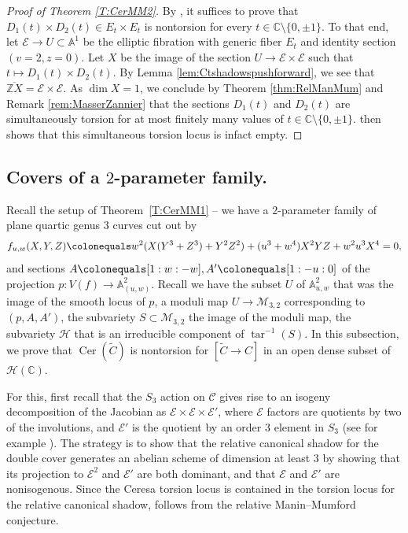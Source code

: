\documentclass[reqno,10pt]{amsart}
\theoremstyle{definition}
\theoremstyle{definition}
\def\C{{\mathbb C}}
\def\Z{{\mathbb Z}}
\def\C{{\mathbb C}}
\DeclareMathOperator{\tar}{tar}
\newcommand{\Cer}{\operatorname{Cer}}
\begin{document}
\begin{proof}[Proof of Theorem \ref{T:CerMM2}]
By , it suffices to prove that $D_1(t)\times D_2(t)\in E_t\times E_t$ is nontorsion for every $t\in\C \setminus \{0,\pm 1\}.$ To that end, let $\mathcal{E}\rightarrow U\subset \mathbb{A}^1$ be the elliptic fibration with generic fiber $E_t$ and identity section $(v=2,z=0)$. Let $X$ be the image of the section $U\rightarrow \mathcal{E}\times\mathcal{E}$ such that $t\mapsto D_1(t)\times D_2(t)$. By Lemma \ref{lem:Ctshadowspushforward}, we see that $\overline{\Z X}=\mathcal{E}\times \mathcal{E}$. As $\dim X = 1$, we conclude by Theorem \ref{thm:RelManMum} and  Remark \ref{rem:MasserZannier} that the sections $D_1(t)$ and $D_2(t)$ are simultaneously torsion for at most finitely many values of $t\in \C \setminus \{0, \pm 1\}$.  then shows that this simultaneous torsion locus is infact empty.
\end{proof}


\subsection{Covers of a $2$-parameter  family.}
Recall the setup of Theorem~\ref{T:CerMM1} -- we have a $2$-parameter family of plane quartic genus $3$ curves cut out by 
\[ f_{u,w}(X,Y,Z) \colonequals w^2(X(Y^3+Z^3)+Y^2Z^2)+(u^3+w^4)X^2YZ+w^2u^3X^4=0, \]
and sections $A \colonequals [1:w:-w], A' \colonequals [1:-u:0]$ of the projection $p \colon V(f) \rightarrow \mathbb{A}^2_{(u,w)}$. Recall we have the subset $U$ of $\mathbb{A}^2_{u,w}$ that was the image of the smooth locus of $p$, a moduli map $U \rightarrow \mathcal{M}_{3,2}$ corresponding to $(p,A,A')$, the subvariety $S \subset \mathcal{M}_{3,2}$ the image of the moduli map, the  subvariety $\mathcal{H}$ that is an irreducible component of $\tar^{-1}(S)$. In this subsection, we prove that $\Cer(\widetilde{C})$ is nontorsion for $[\widetilde{C} \rightarrow C]$ in an open dense subset of $\mathcal{H}(\C)$. 

For this, first recall that the $S_3$ action on $\mathcal{C}$ gives rise to an isogeny decomposition of the Jacobian as $\mathcal{E} \times \mathcal{E} \times \mathcal{E}'$, where $\mathcal{E}$ factors are quotients by two of the involutions, and $\mathcal{E}'$ is the quotient by an order $3$ element in $S_3$ (see for example \cite[Table~2]{DecompJac}). The strategy is to show that the relative canonical shadow for the double cover generates an abelian scheme of dimension at least $3$ by showing that its projection to $\mathcal{E}^2$ and $\mathcal{E}'$ are both dominant, and that $\mathcal{E}$ and $\mathcal{E}'$ are nonisogenous. Since the Ceresa torsion locus is contained in the torsion locus for the relative canonical shadow,  follows from the relative Manin--Mumford conjecture.
\end{document}
